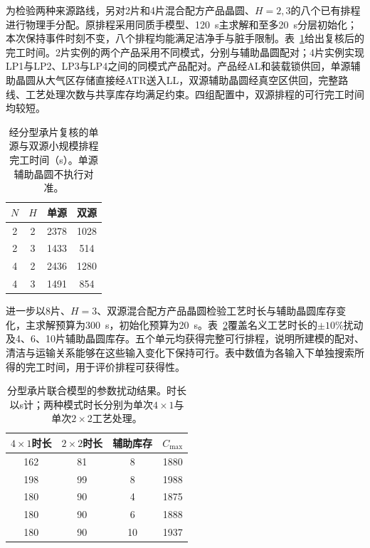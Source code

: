 \documentclass[final,5p,times,twocolumn]{elsarticle}
\begin{document}
为检验两种来源路线，另对2片和4片混合配方产品晶圆、$H=2,3$的八个已有排程进行物理手分配。原排程采用同质手模型、120~s主求解和至多20~s分层初始化；本次保持事件时刻不变，八个排程均能满足洁净手与脏手限制。表~\ref{tab:joint-source-cn}给出复核后的完工时间。2片实例的两个产品采用不同模式，分别与辅助晶圆配对；4片实例实现LP1与LP2、LP3与LP4之间的同模式产品配对。产品经AL和装载锁供回，单源辅助晶圆从大气区存储直接经ATR送入LL，双源辅助晶圆经真空区供回，完整路线、工艺处理次数与共享库存均满足约束。四组配置中，双源排程的可行完工时间均较短。

\begin{table}[!t]\centering\scriptsize\setlength{\tabcolsep}{4pt}
\caption{经分型承片复核的单源与双源小规模排程完工时间（s）。单源辅助晶圆不执行对准。}
\label{tab:joint-source-cn}
\begin{tabular}{cccc}\toprule
$N$ & $H$ & 单源 & 双源\\\midrule
2 & 2 & 2378 & 1028\\
2 & 3 & 1433 & 514\\
4 & 2 & 2436 & 1280\\
4 & 3 & 1491 & 854\\
\bottomrule\end{tabular}\end{table}

进一步以8片、$H=3$、双源混合配方产品晶圆检验工艺时长与辅助晶圆库存变化，主求解预算为300~s，初始化预算为20~s。表~\ref{tab:joint-perturb-cn}覆盖名义工艺时长的$\pm10\%$扰动及4、6、10片辅助晶圆库存。五个单元均获得完整可行排程，说明所建模的配对、清洁与运输关系能够在这些输入变化下保持可行。表中数值为各输入下单独搜索所得的完工时间，用于评价排程可获得性。

\begin{table}[!t]\centering\scriptsize\setlength{\tabcolsep}{4pt}
\caption{分型承片联合模型的参数扰动结果。时长以s计；两种模式时长分别为单次$4\times1$与单次$2\times2$工艺处理。}
\label{tab:joint-perturb-cn}
\begin{tabular}{cccc}\toprule
$4\times1$时长 & $2\times2$时长 & 辅助库存 & $C_{\max}$\\\midrule
162 & 81 & 8 & 1880\\
198 & 99 & 8 & 1988\\
180 & 90 & 4 & 1875\\
180 & 90 & 6 & 1888\\
180 & 90 & 10 & 1937\\
\bottomrule\end{tabular}\end{table}
\end{document}
